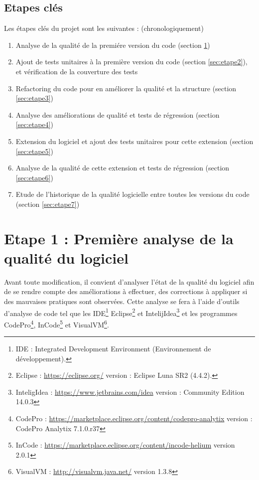 \documentclass[12pt,a4paper,final]{article}
\begin{document}
\subsection{Etapes clés}
Les étapes clés du projet sont les suivantes : (chronologiquement)
\begin{enumerate}
\item Analyse de la qualité de la premiére version du code (section \ref{sec:etape1})
\item Ajout de tests unitaires à la première version du code (section \ref{sec:etape2}), et vérification de la couverture des tests
\item Refactoring du code pour en améliorer la qualité et la structure (section \ref{sec:etape3})
\item Analyse des améliorations de qualité et tests de régression (section \ref{sec:etape4})
\item Extension du logiciel et ajout des tests unitaires pour cette extension (section \ref{sec:etape5})
\item Analyse de la qualité de cette extension et tests de régression (section \ref{sec:etape6})
\item Etude de l'historique de la qualité logicielle entre toutes les versions du code (section \ref{sec:etape7})
\end{enumerate}
\section{Etape 1 : Première analyse de la qualité du logiciel}\label{sec:etape1}
Avant toute modification, il convient d'analyser l'état de la qualité du logiciel afin de se rendre compte des améliorations à effectuer, des corrections à appliquer si des mauvaises pratiques sont observées. Cette analyse se fera à l'aide d'outils d'analyse de code tel que les IDE\footnote{IDE : Integrated Development Environment (Environnement de développement).} Eclipse\footnote{Eclipse : \url{https://eclipse.org/} version : Eclipse Luna SR2 (4.4.2).} et IntelijIdea\footnote{InteligIdea : \url{https://www.jetbrains.com/idea} version : Community Edition 14.0.3 } et les programmes CodePro\footnote{CodePro : \url{https://marketplace.eclipse.org/content/codepro-analytix} version : CodePro Analytix 7.1.0.r37}, InCode\footnote{InCode : \url{https://marketplace.eclipse.org/content/incode-helium} version 2.0.1} et VisualVM\footnote{VisualVM : \url{http://visualvm.java.net/} version 1.3.8}.
\end{document}
